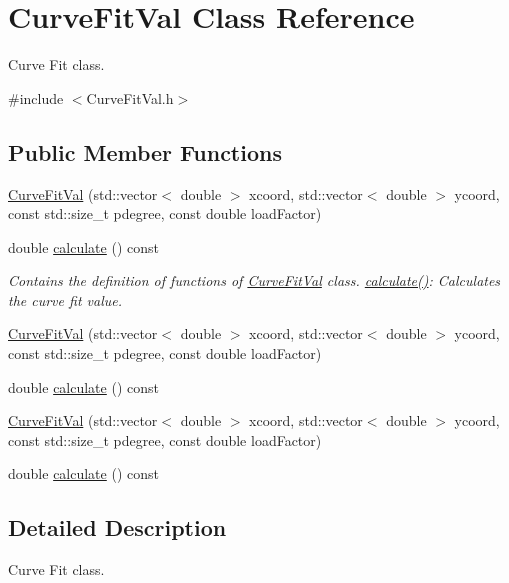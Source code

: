 \hypertarget{class_curve_fit_val}{}\section{Curve\+Fit\+Val Class Reference}
\label{class_curve_fit_val}


Curve Fit class.  




{\ttfamily \#include $<$Curve\+Fit\+Val.\+h$>$}

\subsection*{Public Member Functions}
\begin{DoxyCompactItemize}
\item 
\hyperlink{class_curve_fit_val_ad58e4933db92ceb5b9a42276c398d034}{Curve\+Fit\+Val} (std\+::vector$<$ double $>$ xcoord, std\+::vector$<$ double $>$ ycoord, const std\+::size\+\_\+t pdegree, const double load\+Factor)
\item 
double \hyperlink{class_curve_fit_val_af928003c67aed9c644632a548be08713}{calculate} () const
\begin{DoxyCompactList}\small\item\em Contains the definition of functions of \hyperlink{class_curve_fit_val}{Curve\+Fit\+Val} class. \hyperlink{class_curve_fit_val_af928003c67aed9c644632a548be08713}{calculate()}\+: Calculates the curve fit value. \end{DoxyCompactList}\item 
\hyperlink{class_curve_fit_val_ad58e4933db92ceb5b9a42276c398d034}{Curve\+Fit\+Val} (std\+::vector$<$ double $>$ xcoord, std\+::vector$<$ double $>$ ycoord, const std\+::size\+\_\+t pdegree, const double load\+Factor)
\item 
double \hyperlink{class_curve_fit_val_af928003c67aed9c644632a548be08713}{calculate} () const
\item 
\hyperlink{class_curve_fit_val_ad58e4933db92ceb5b9a42276c398d034}{Curve\+Fit\+Val} (std\+::vector$<$ double $>$ xcoord, std\+::vector$<$ double $>$ ycoord, const std\+::size\+\_\+t pdegree, const double load\+Factor)
\item 
double \hyperlink{class_curve_fit_val_af928003c67aed9c644632a548be08713}{calculate} () const
\end{DoxyCompactItemize}


\subsection{Detailed Description}
Curve Fit class. 

